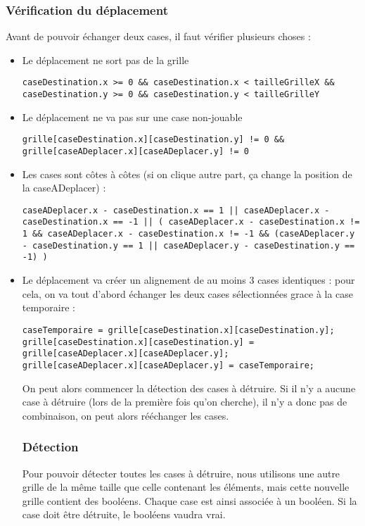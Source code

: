 \subsubsection{Vérification du déplacement}
Avant de pouvoir échanger deux cases, il faut vérifier plusieurs choses :
\begin{itemize}
	\item
		Le déplacement ne sort pas de la grille
\begin{lstlisting}
caseDestination.x >= 0 && caseDestination.x < tailleGrilleX && caseDestination.y >= 0 && caseDestination.y < tailleGrilleY
\end{lstlisting}
	\item
		Le déplacement ne va pas sur une case non-jouable
\begin{lstlisting}
grille[caseDestination.x][caseDestination.y] != 0 && grille[caseADeplacer.x][caseADeplacer.y] != 0
\end{lstlisting}
	\item
		Les cases sont côtes à côtes (si on clique autre part, ça change la position de la caseADeplacer) :
\begin{lstlisting}
caseADeplacer.x - caseDestination.x == 1 || caseADeplacer.x - caseDestination.x == -1 || ( caseADeplacer.x - caseDestination.x != 1 && caseADeplacer.x - caseDestination.x != -1 && (caseADeplacer.y - caseDestination.y == 1 || caseADeplacer.y - caseDestination.y == -1) )
\end{lstlisting}
	\item
		Le déplacement va créer un alignement de au moins 3 cases identiques : pour cela, on va tout d'abord échanger les deux cases sélectionnées grace à la case temporaire :
\begin{lstlisting}
caseTemporaire = grille[caseDestination.x][caseDestination.y];
grille[caseDestination.x][caseDestination.y] = grille[caseADeplacer.x][caseADeplacer.y];
grille[caseADeplacer.x][caseADeplacer.y] = caseTemporaire;
\end{lstlisting}
		On peut alors commencer la détection des cases à détruire. Si il n'y a aucune case à détruire (lors de la première fois qu'on cherche), il n'y a donc pas de combinaison, on peut alors rééchanger les cases.

\subsubsection{Détection}	
	
Pour pouvoir détecter toutes les cases à détruire, nous utilisons une autre grille de la même taille que celle contenant les éléments, mais cette nouvelle grille contient des booléens. Chaque case est ainsi associée à un booléen. Si la case doit être détruite, le booléens vaudra vrai.


\end{itemize}
